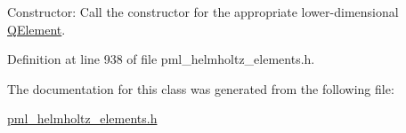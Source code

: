 Constructor\+: Call the constructor for the appropriate lower-\/dimensional \hyperlink{classoomph_1_1QElement}{Q\+Element}. 



Definition at line 938 of file pml\+\_\+helmholtz\+\_\+elements.\+h.



The documentation for this class was generated from the following file\+:\begin{DoxyCompactItemize}
\item 
\hyperlink{pml__helmholtz__elements_8h}{pml\+\_\+helmholtz\+\_\+elements.\+h}\end{DoxyCompactItemize}
